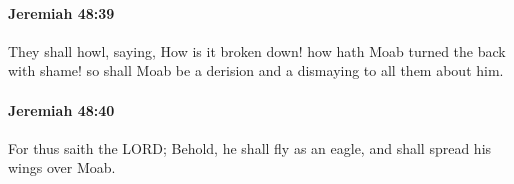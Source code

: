 		\paragraph{Jeremiah 48:39} %
			\label{JEREMIAH-48-39}

			They shall howl, saying, How is it broken down! how hath Moab turned the back with shame! so shall Moab be a derision and a dismaying to all them about him.


		\paragraph{Jeremiah 48:40} %
			\label{JEREMIAH-48-40}

			For thus saith the LORD; Behold, he shall fly as an eagle, and shall spread his wings over Moab.


